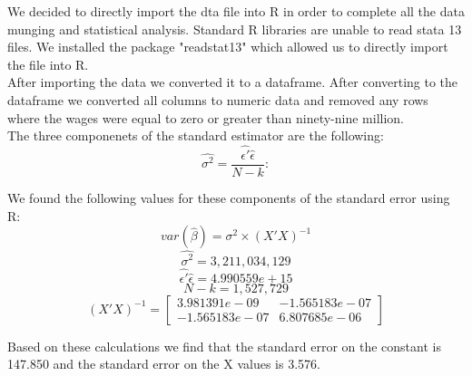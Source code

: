 \documentclass{article}
\begin{document}
We decided to directly import the dta file into R in order to complete all the data munging and statistical analysis.  Standard R libraries are unable to read stata 13 files.  We installed the package "readstat13" which allowed us to directly import the file into R.
\\
After importing the data we converted it to a dataframe.  After converting to the dataframe we converted all columns to numeric data and removed any rows where the wages were equal to zero or greater than ninety-nine million.  
\\
The three componenets of the standard estimator are the following:
\\

\begin{equation}
\hat{\sigma^2}=\frac{\hat{\epsilon'} \hat{\epsilon}}{N-k}:
\end{equation}

We found the following values for these components of the standard error using R:
\\
\begin{equation}
var(\hat{\beta})=\sigma^2 \times (X'X)^{-1}
\end{equation}
\begin{equation}
\hat{\sigma^2}=3,211,034,129
\end{equation}
\begin{equation}
\hat{\epsilon'}\hat{\epsilon}=4.990559e+15
\end{equation}
\begin{equation}
N-k=1,527,729
\end{equation}
\begin{equation}
(X'X)^{-1}=
\begin{bmatrix}

3.981391e-09 & -1.565183e-07 \\
-1.565183e-07 & 6.807685e-06
\end{bmatrix}

\end{equation}

Based on these calculations we find that the standard error on the constant is 147.850 and the standard error on the X values is 3.576.
\end{document}
